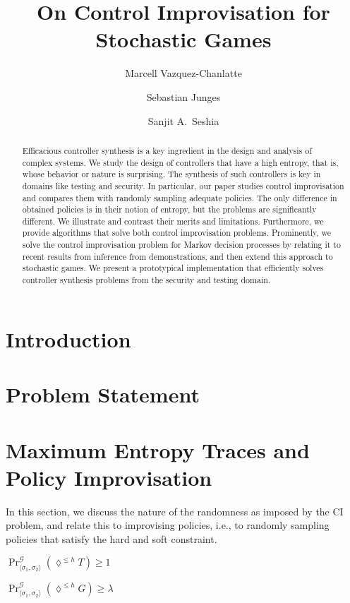 \documentclass[runningheads]{llncs}
\title{On Control Improvisation for Stochastic Games}
\author{Marcell Vazquez-Chanlatte \and Sebastian Junges \and Sanjit A.\ Seshia}
\institute{University of California, Berkeley, CA, USA}
\newcommand{\sg}{\mathcal{G}}
\newcommand{\eventually}[1]{\lozenge^{\leq #1}}
\newcommand{\sched}{\sigma}
\begin{document}
\maketitle{}
\begin{abstract}
	Efficacious controller synthesis is a key ingredient in the design and analysis of complex systems. We study the design of controllers that have a high entropy, that is, whose behavior or nature is surprising. The synthesis of such controllers is key in domains like testing and security. 
	In particular, our paper studies control improvisation and compares them with randomly sampling adequate policies. The only difference in obtained policies is in their notion of entropy, but the problems are significantly different.  We illustrate and contrast their merits and limitations. Furthermore, we provide algorithms that solve both control improvisation problems. Prominently, we solve the control improvisation problem for Markov decision processes by relating it to recent results from inference from demonstrations, and then extend this approach to stochastic games. We present a prototypical implementation that efficiently solves controller synthesis problems from the security and testing domain. 
\end{abstract}
\section{Introduction}

\section{Problem Statement}

\section{Maximum Entropy Traces and Policy Improvisation}
In this section, we discuss the nature of the randomness as imposed by the CI problem, and relate this to improvising policies, i.e., to randomly sampling policies that satisfy the hard and soft constraint.

\begin{mdframed}

\begin{compactenum}
	\item $\Pr^\sg_{\langle \sched_1,\sched_2 \rangle}(\eventually{h} T) \geq 1$
	\item $\Pr^\sg_{\langle \sched_1,\sched_2 \rangle}(\eventually{h} G) \geq \lambda$ 
\end{compactenum}
\end{mdframed}
\end{document}
